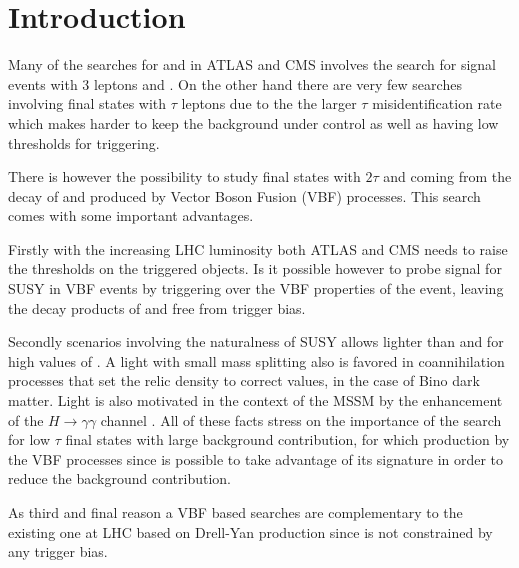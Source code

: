 \section {Introduction}

Many of the searches for \charginopm and \neutralinotwo in ATLAS \cite{Aad:2012hba, ATLAS:2012ab} and CMS \cite{Chatrchyan:2012mea} involves the search for signal events with 3 leptons and \met. On the other hand there are very few searches involving final states with $\tau$ leptons due to the the larger $\tau$ misidentification rate which makes harder to keep the background under control as well as having low \pt thresholds for triggering.

There is however the possibility to study final states with $2\tau$ and \met coming from the decay of \charginopm and \neutralinotwo produced by Vector Boson Fusion (VBF) processes. This search comes with some important advantages.

Firstly with the increasing LHC luminosity both ATLAS and CMS needs to raise the \pt thresholds on the triggered objects. Is it possible however to probe signal for SUSY in VBF events by triggering over the VBF properties of the event, leaving the decay products of \charginopm and \neutralinotwo free from trigger bias. 

Secondly scenarios involving the naturalness of SUSY allows \stau lighter than \smuon and \selectron for high values of \tanbeta. A light \stau with small mass splitting also is favored in coannihilation processes \cite{Griest:1990kh} that set the relic density to correct values, in the case of Bino dark matter. Light \stau is also motivated in the context of the MSSM by the enhancement of the $H \longrightarrow \gamma\gamma$ channel \cite{Carena:2011aa}. All of these facts stress on the importance of the search for low \pt $\tau$ final states with large background contribution, for which production by the VBF processes since is possible to take advantage of its signature in order to reduce the background contribution. 

As third and final reason a VBF based searches are complementary to the existing one at LHC based on Drell-Yan production since is not constrained by any trigger bias. 

